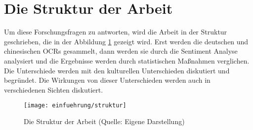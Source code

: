 \section{Die Struktur der Arbeit}
Um diese Forschungsfragen zu antworten, wird die Arbeit in der Struktur geschrieben, die in der Abbildung \ref{fig:struktur} gezeigt wird. Erst werden die deutschen und chinesischen \ac{OCRs} gesammelt, dann werden sie durch die Sentiment Analyse analysiert und die Ergebnisse werden durch statistischen Maßnahmen verglichen. Die Unterschiede werden mit den kulturellen Unterschieden diskutiert und begründet. Die Wirkungen von dieser Unterschieden werden auch in verschiedenen Sichten diskutiert.

\begin{figure}[htb]
	\centering
	\texttt{[image: einfuehrung/struktur]}
	\caption[Die Struktur der Arbeit]{Die Struktur der Arbeit (Quelle: Eigene Darstellung)}
	\label{fig:struktur}
\end{figure}

